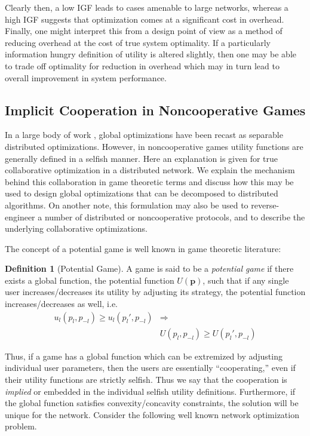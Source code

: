 \documentclass[11pt]{IEEEtran}
\theoremstyle{definition}
\newtheorem{definition}{Definition}
\begin{document}
Clearly then, a low IGF leads to cases amenable to large networks, whereas a high IGF suggests that optimization comes at a significant cost in overhead. Finally, one might interpret this from a design point of view as a method of reducing overhead at the cost of true system optimality. If a particularly information hungry definition of utility is altered slightly, then one may be able to trade off optimality for reduction in overhead which may in turn lead to overall improvement in system performance.



\subsection{Implicit Cooperation in Noncooperative Games}
In a large body of work \cite{FB04,CLD05,NKGB00,WK03}, global optimizations have been recast as separable distributed optimizations. However, in noncooperative games utility functions are generally defined in a selfish manner. Here an explanation is given for true collaborative optimization in a distributed network. We explain the mechanism behind this collaboration in game theoretic terms and discuss how this may be used to design global optimizations that can be decomposed to distributed algorithms. On another note, this formulation may also be used to reverse-engineer a number of distributed or noncooperative protocols, and to describe the underlying collaborative optimizations.

The concept of a potential game is well known in game theoretic literature:
\begin{definition}[Potential Game]
	A game is said to be a \emph{potential game} if there exists a global function, the potential function $U(\mathbf{p})$, such that if any single user increases/decreases its utility by adjusting its strategy, the potential function increases/decreases as well, i.e.
	\begin{align}
		u_l(p_l,p_{-l}) \geq u_l(p_l',p_{-l}) &\Longrightarrow \nonumber \\
			&U(p_l,p_{-l}) \geq U(p_l',p_{-l})
	\end{align}
\end{definition}

Thus, if a game has a global function which can be extremized by adjusting individual user parameters, then the users are essentially ``cooperating,'' even if their utility functions are strictly selfish. Thus we say that the cooperation is {\em implied} or embedded in the individual selfish utility definitions. Furthermore, if the global function satisfies convexity/concavity constraints, the solution will be unique for the network. Consider the following well known network optimization problem.
\end{document}
